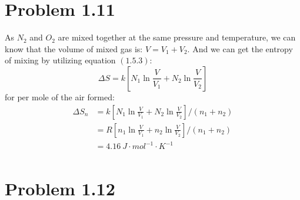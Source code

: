 \documentclass{article}
\begin{document}
\section*{Problem 1.11}
    As $N_2$ and $O_2$ are mixed together at the same pressure and temperature, we can know that the volume of mixed gas is: $V=V_1+V_2$. And we can get the entropy of mixing by utilizing equation $(1.5.3)$:
    \begin{equation}
        \Delta S=k \left[N_1 \ln\frac{V}{V_1}+N_2 \ln\frac{V}{V_2}\right]
    \end{equation}
    for per mole of the air formed:
    \begin{equation}
        \begin{aligned}
            \Delta S_n&=k \left[N_1 \ln\frac{V}{V_1}+N_2 \ln\frac{V}{V_2}\right]/(n_1+n_2)\\
                    &=R \left[n_1 \ln\frac{V}{V_1}+n_2 \ln\frac{V}{V_2}\right]/(n_1+n_2)\\
                    &=4.16~J\cdot mol^{-1}\cdot K^{-1}\\
        \end{aligned}
    \end{equation}
\section*{Problem 1.12}
\end{document}
